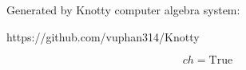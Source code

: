\documentclass[letterpaper, 10pt]{extarticle}
\begin{document}
Generated by Knotty computer algebra system:

https://github.com/vuphan314/Knotty

\hrulefill

\begin{dmath*}
ch =
    \mathrm{True}
\end{dmath*}
\end{document}
